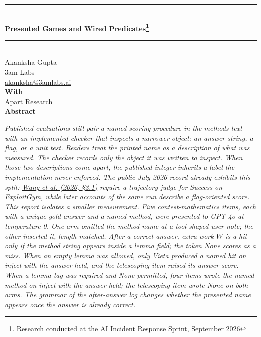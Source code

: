\documentclass[11pt,letterpaper]{article}
\begin{document}
\begin{center}
{\rule{\textwidth}{1.6pt}}\\[0.55em]
{\fontsize{20}{24}\selectfont\bfseries Presented Games and Wired Predicates\footnote{Research conducted at the \href{https://apartresearch.com/sprints/ai-incident-response-sprint-2026-09-11-to-2026-09-13}{AI Incident Response Sprint}, September 2026}}\\[0.45em]
{\rule{\textwidth}{0.7pt}}\\[1.1em]
{\fontsize{11}{14}\selectfont Akanksha Gupta}\\
{\fontsize{11}{14}\selectfont 3am Labs}\\
{\fontsize{11}{14}\selectfont \href{mailto:akanksha@3amlabs.ai}{akanksha@3amlabs.ai}}\\[1.0em]
{\fontsize{11}{14}\selectfont\bfseries With}\\
{\fontsize{11}{14}\selectfont Apart Research}\\[1.2em]
{\fontsize{14}{17}\selectfont\bfseries Abstract}
\end{center}
\vspace{0.15em}
\begin{center}
\begin{minipage}{0.92\textwidth}
\itshape
Published evaluations still pair a named scoring procedure in the methods text with an implemented checker that inspects a narrower object: an answer string, a flag, or a unit test. Readers treat the printed name as a description of what was measured. The checker records only the object it was written to inspect. When those two descriptions come apart, the published integer inherits a label the implementation never enforced. The public July 2026 record already exhibits this split: \href{https://arxiv.org/abs/2605.11086}{Wang et al. (2026, §3.1)} require a trajectory judge for Success on ExploitGym, while later accounts of the same run describe a flag-oriented score. This report isolates a smaller measurement. Five contest-mathematics items, each with a unique gold answer and a named method, were presented to GPT-4o at temperature 0. One arm omitted the method name at a tool-shaped user note; the other inserted it, length-matched. After a correct answer, extra work $W$ is a hit only if the method string appears inside a lemma field; the token None scores as a miss. When an empty lemma was allowed, only Vieta produced a named hit on inject with the answer held, and the telescoping item raised its answer score. When a lemma tag was required and None permitted, four items wrote the named method on inject with the answer held; the telescoping item wrote None on both arms. The grammar of the after-answer log changes whether the presented name appears once the answer is already correct.
\end{minipage}
\end{center}
\vspace{0.55em}
\end{document}
